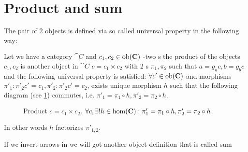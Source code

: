 \section{Product and sum}
The pair of 2 objects is defined via so called universal property in
the following way:
\begin{definition}[Product]
\label{def:product}
Let we have a category $\cat{C}$ and $c_1, c_2 \in \mathrm{ob}(\mathbf{C})$ -two
s the product of the objects $c_1, c_2$ is
another object in $\cat{C}$ $c = c_1 \times c_2$ with 2
s $\pi_1, \pi_2$ such that $a = g_a c, b = g_b
c$ and the 
following universal property is satisfied: $\forall c' \in \mathrm{ob}(\mathbf{C})$
and morphisms $\pi'_1: \pi'_2 c' = c_1, \pi'_2: \pi'_2 c' = c_2$, exists unique
morphism $h$ such that the following diagram (see \cref{fig:product})
commutes, i.e. $\pi'_1 = \pi_1 \circ h, \pi'_2 = \pi_2 \circ h$.
\begin{figure}
  \centering
  \caption{Product $c = c_1 \times c_2$. $\forall c, \exists! h \in
    \mathrm{hom}(\mathbf{C}): \pi'_1 = \pi_1 \circ h, \pi'_2 = \pi_2 \circ h$.}
  \label{fig:product}
\end{figure}
In other words $h$ factorizes $\pi'_{1,2}$.
\end{definition}

If we invert arrows in  we will got another
object definition that is called sum

